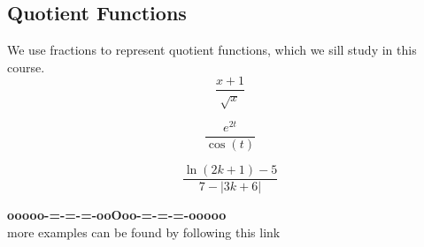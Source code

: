 \documentclass{ximera}
\begin{document}
\subsection*{Quotient Functions}


We use fractions to represent quotient functions, which we sill study in this course. \\




\[
\frac{x+1}{\sqrt{x}}
\]


\[
\frac{e^{2t}}{\cos(t)}
\]


\[
\frac{\ln(2k+1)-5}{7 - |3k+6|}
\]




















































\begin{center}
\textbf{\textcolor{green!50!black}{ooooo-=-=-=-ooOoo-=-=-=-ooooo}} \\

more examples can be found by following this link\\ 

\end{center}
\end{document}
